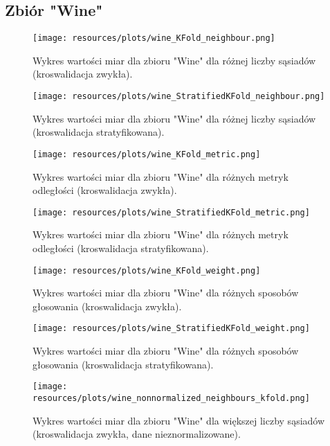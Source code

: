 \subsection{Zbiór "Wine"}
    \begin{figure}[H]
        \center
        \texttt{[image: resources/plots/wine\_KFold\_neighbour.png]}
        \caption{Wykres wartości miar dla zbioru "Wine" dla różnej liczby sąsiadów (kroswalidacja zwykła).}
    \end{figure}

    \begin{figure}[H]
        \center
        \texttt{[image: resources/plots/wine\_StratifiedKFold\_neighbour.png]}
        \caption{Wykres wartości miar dla zbioru "Wine" dla różnej liczby sąsiadów (kroswalidacja stratyfikowana).}
    \end{figure}

    \pagebreak

    \begin{figure}[H]
        \center
        \texttt{[image: resources/plots/wine\_KFold\_metric.png]}
        \caption{Wykres wartości miar dla zbioru "Wine" dla różnych metryk odległości (kroswalidacja zwykła).}
    \end{figure}

    \begin{figure}[H]
        \center
        \texttt{[image: resources/plots/wine\_StratifiedKFold\_metric.png]}
        \caption{Wykres wartości miar dla zbioru "Wine" dla różnych metryk odległości (kroswalidacja stratyfikowana).}
    \end{figure}

    \pagebreak

    \begin{figure}[H]
        \center
        \texttt{[image: resources/plots/wine\_KFold\_weight.png]}
        \caption{Wykres wartości miar dla zbioru "Wine" dla różnych sposobów głosowania (kroswalidacja zwykła).}
    \end{figure}

    \begin{figure}[H]
        \center
        \texttt{[image: resources/plots/wine\_StratifiedKFold\_weight.png]}
        \caption{Wykres wartości miar dla zbioru "Wine" dla różnych sposobów głosowania (kroswalidacja stratyfikowana).}
    \end{figure}


    \begin{figure}[H]
        \center
        \texttt{[image: resources/plots/wine\_nonnormalized\_neighbours\_kfold.png]}
        \caption{Wykres wartości miar dla zbioru "Wine" dla większej liczby sąsiadów (kroswalidacja zwykła, dane nieznormalizowane).}
    \end{figure}

